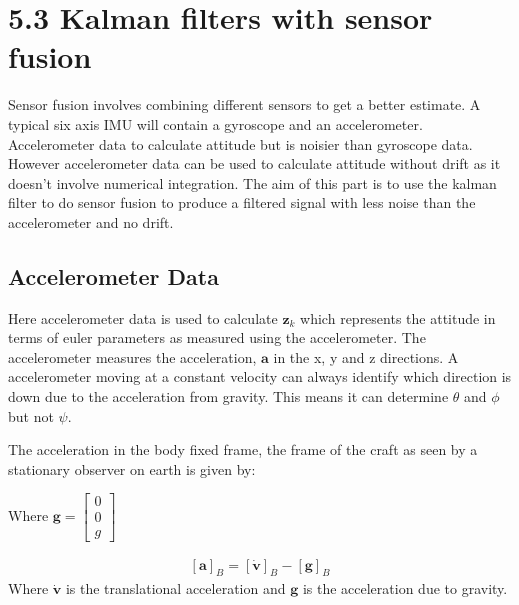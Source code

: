 \documentclass[letterpaper,10pt,english]{jupyterBook}
\begin{document}
\section{5.3 Kalman filters with sensor fusion}
\label{\detokenize{5IMU:kalman-filters-with-sensor-fusion}}
\sphinxAtStartPar
Sensor fusion involves combining different sensors to get a better estimate. A typical six axis IMU will contain a gyroscope and an accelerometer. Accelerometer data to calculate attitude but is noisier than gyroscope data. However accelerometer data can be used to calculate attitude without drift as it doesn’t involve numerical integration. The aim of this part is to use the kalman filter to do sensor fusion to produce a filtered signal with less noise than the accelerometer and no drift.


\subsection{Accelerometer Data}
\label{\detokenize{5IMU:accelerometer-data}}
\sphinxAtStartPar
Here accelerometer data is used to calculate \(\boldsymbol{z}_k\) which represents the attitude in terms of euler parameters as measured using the accelerometer. The accelerometer measures the acceleration, \(\boldsymbol{a}\) in the x, y and z directions. A accelerometer moving at a constant velocity can always identify which direction is down due to the acceleration from gravity. This means it can determine \(\theta\) and \(\phi\) but not \(\psi\).

\sphinxAtStartPar
The acceleration in the body fixed frame, the frame of the craft as seen by a stationary observer on earth is given by:

\begin{sphinxShadowBox}
\sphinxstylesidebartitle{}

\sphinxAtStartPar
Where \(\boldsymbol{g} = \begin{bmatrix} 0 \\ 0 \\ g \end{bmatrix}\)
\end{sphinxShadowBox}
\begin{equation}\label{equation:5IMU:accelerometer2}
\begin{split}[\boldsymbol{a}]_B = [\dot{\boldsymbol{v}}]_B - [\boldsymbol{g}]_B\end{split}
\end{equation}
\sphinxAtStartPar
Where \(\dot{\boldsymbol{v}}\) is the translational acceleration and \(\boldsymbol{g}\) is the acceleration due to gravity. 
\end{document}
